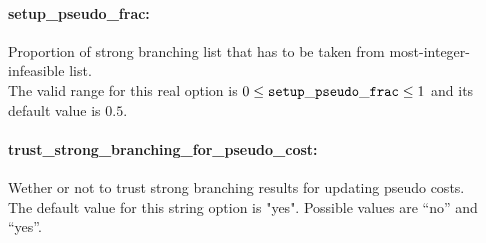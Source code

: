 \paragraph{setup\_pseudo\_frac:}\label{sec:setup_pseudo_frac} Proportion of strong branching list that has to be taken from most-integer-infeasible list. $\;$ \\
 The valid range for this real option is 
$0 \le {\tt setup\_pseudo\_frac } \le 1$
and its default value is $0.5$.


\paragraph{trust\_strong\_branching\_for\_pseudo\_cost:}\label{sec:trust_strong_branching_for_pseudo_cost} Wether or not to trust strong branching results for updating pseudo costs. $\;$ \\
The default value for this string option is "yes".
Possible values are ``no'' and ``yes''.


